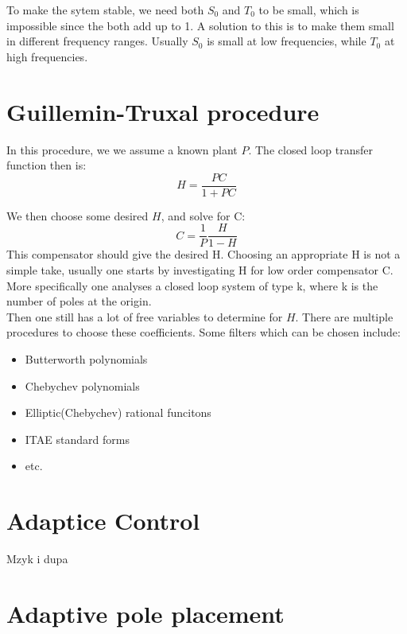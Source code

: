 To make the sytem stable, we need both $S_0$ and $T_0$ to be small, which is impossible since the both add up to 1.
A solution to this is to make them small in different frequency ranges. Usually $S_0$ is small at low frequencies, while
$T_0$ at high frequencies.

\section{Guillemin-Truxal procedure}

In this procedure, we we assume a known plant $P$. The closed loop transfer function then is:
 \begin{equation}
    H = \frac{PC}{1+PC}
\end{equation}

We then choose some desired $H$, and solve for C:
 \begin{equation}
    C = \frac{1}{P} \frac{H}{1-H}
\end{equation}
This compensator should give the desired H. 
Choosing an appropriate H is not a simple take, usually one starts by investigating H for
low order compensator C. More specifically one analyses a closed loop system of type k, where k is the number
of poles at the origin.
\\
Then one still has a lot of free variables to determine for $H$. There are multiple procedures to choose these
coefficients.
Some filters which can be chosen include:
 \begin{itemize}
        \item Butterworth polynomials
        \item Chebychev polynomials
        \item Elliptic(Chebychev) rational funcitons
        \item ITAE standard forms
        \item etc.
\end{itemize}

\section{Adaptice Control}
Mzyk i dupa
\section{Adaptive pole placement}

